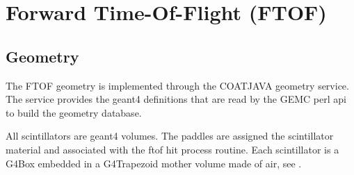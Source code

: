 \section{Forward Time-Of-Flight (FTOF)}

\subsection{Geometry}

The FTOF geometry is implemented through the COATJAVA geometry service.
The service provides the geant4 definitions that are read by the GEMC perl api to build the geometry database.

All scintillators are geant4 volumes. The paddles are assigned the scintillator material and associated with the ftof hit process routine.
Each scintillator is a G4Box embedded in a G4Trapezoid mother volume made of air, see .

